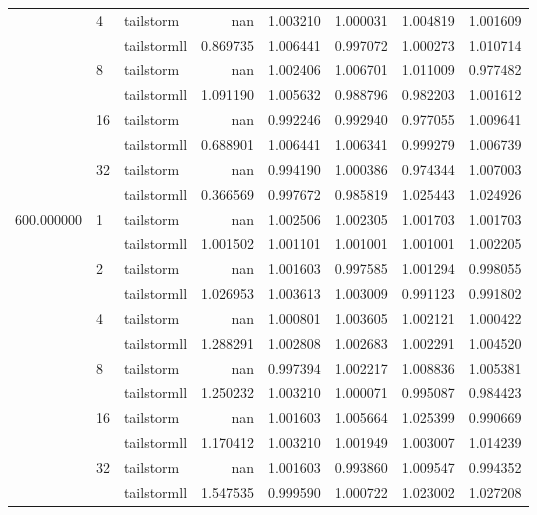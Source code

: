 \begin{tabular}{lllrrrrr}
 & \multirow[c]{2}{*}{4} & tailstorm & nan & 1.003210 & 1.000031 & 1.004819 & 1.001609 \\
 &  & tailstormll & 0.869735 & 1.006441 & 0.997072 & 1.000273 & 1.010714 \\
 & \multirow[c]{2}{*}{8} & tailstorm & nan & 1.002406 & 1.006701 & 1.011009 & 0.977482 \\
 &  & tailstormll & 1.091190 & 1.005632 & 0.988796 & 0.982203 & 1.001612 \\
 & \multirow[c]{2}{*}{16} & tailstorm & nan & 0.992246 & 0.992940 & 0.977055 & 1.009641 \\
 &  & tailstormll & 0.688901 & 1.006441 & 1.006341 & 0.999279 & 1.006739 \\
 & \multirow[c]{2}{*}{32} & tailstorm & nan & 0.994190 & 1.000386 & 0.974344 & 1.007003 \\
 &  & tailstormll & 0.366569 & 0.997672 & 0.985819 & 1.025443 & 1.024926 \\
\multirow[c]{12}{*}{600.000000} & \multirow[c]{2}{*}{1} & tailstorm & nan & 1.002506 & 1.002305 & 1.001703 & 1.001703 \\
 &  & tailstormll & 1.001502 & 1.001101 & 1.001001 & 1.001001 & 1.002205 \\
 & \multirow[c]{2}{*}{2} & tailstorm & nan & 1.001603 & 0.997585 & 1.001294 & 0.998055 \\
 &  & tailstormll & 1.026953 & 1.003613 & 1.003009 & 0.991123 & 0.991802 \\
 & \multirow[c]{2}{*}{4} & tailstorm & nan & 1.000801 & 1.003605 & 1.002121 & 1.000422 \\
 &  & tailstormll & 1.288291 & 1.002808 & 1.002683 & 1.002291 & 1.004520 \\
 & \multirow[c]{2}{*}{8} & tailstorm & nan & 0.997394 & 1.002217 & 1.008836 & 1.005381 \\
 &  & tailstormll & 1.250232 & 1.003210 & 1.000071 & 0.995087 & 0.984423 \\
 & \multirow[c]{2}{*}{16} & tailstorm & nan & 1.001603 & 1.005664 & 1.025399 & 0.990669 \\
 &  & tailstormll & 1.170412 & 1.003210 & 1.001949 & 1.003007 & 1.014239 \\
 & \multirow[c]{2}{*}{32} & tailstorm & nan & 1.001603 & 0.993860 & 1.009547 & 0.994352 \\
 &  & tailstormll & 1.547535 & 0.999590 & 1.000722 & 1.023002 & 1.027208 \\
\end{tabular}
